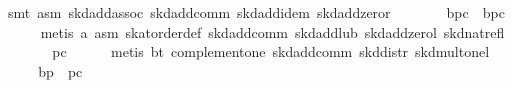 \begin{isabellebody}
\ {}smt\ asm\ skd{}add{}assoc\ skd{}add{}comm\ skd{}add{}idem\ skd{}add{}zeror{}\isanewline
\ \ \isamarkupfalse%
\ \isamarkupfalse%
\ {}{}{}{}\ {}\ {}b{}p{}{}c\ {}\ b{}p{}{}c{}\isanewline
\ \ \ \ \isamarkupfalse%
\ {}metis\ a\ asm\ skat{}order{}def\ skd{}add{}comm\ skd{}add{}lub\ skd{}add{}zerol\ skd{}nat{}refl{}\isanewline
\ \ \isamarkupfalse%
\ \isamarkupfalse%
\ {}{}{}{}\ {}\ p{}{}c{}\isanewline
\ \ \ \ \isamarkupfalse%
\ {}metis\ bt\ complement{}one\ skd{}add{}comm\ skd{}distr\ skd{}mult{}onel{}\isanewline
\ \ \isamarkupfalse%
\ \isamarkupfalse%
\ {}{}b{}p\ {}\ p{}{}c{}\ \isamarkupfalse%

\end{isabellebody}
